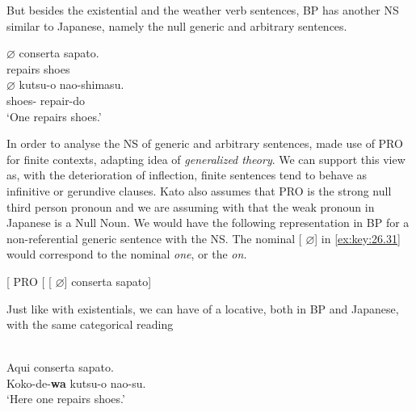 \documentclass[output=paper]{langsci/langscibook}
\begin{document}
But besides the existential and the weather verb sentences,
\gls{BP} has another NS similar to Japanese, namely
the null generic and arbitrary sentences.

\ea%
    \label{ex:key:26.30}
    \ea
	\gll	$\varnothing$ conserta sapato.\\
			{}  repairs shoes\\
    \ex
	\gll	$\varnothing$ kutsu-o       nao-shimasu.\\
            {}  shoes-\Acc{}   repair-do\\
	\glt	\enquote*{One repairs shoes.}
    \z
\z

In order to analyse the NS of generic and arbitrary sentences, \citet{Kato2000}
made use of PRO for finite contexts, adapting  idea of
\emph{generalized  theory}.  We can support this view as, with the
deterioration of inflection, finite sentences tend to behave as infinitive or
gerundive clauses. Kato also assumes that PRO is the strong null third person
pronoun and we are assuming with \citet{Tomioka2003} that the weak pronoun in
Japanese is a Null Noun. We would have the following representation in
\gls{BP} for a non-referential generic sentence with
the NS.  The nominal [ $\varnothing$] in \eqref{ex:key:26.31} would
correspond to the  nominal \emph{one}, or the 
\emph{on.}

\ea%
    \label{ex:key:26.31}
    {}[ PRO [ [ $\varnothing$] conserta sapato]
\z

Just like with existentials, we can have  of a locative, both in
\gls{BP}  and Japanese, with the same categorical
reading

\ea%
    \label{ex:key:26.36bp}
    \ea{}\\
        Aqui conserta sapato.
    \ex{}\\
        Koko-de-\textbf{wa}  kutsu-o nao-su.\\
        ‘Here one repairs shoes.’
    \z
\z
\end{document}
